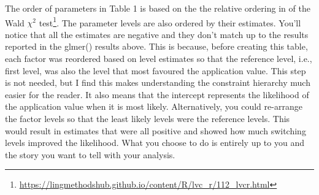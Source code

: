 \documentclass[
  10pt,
  letterpaper]{article}
\renewcommand\texttt[1]{{\ttfamily\color{BrickRed}#1}}
\DeclareRobustCommand{\href}[2]{#2\footnote{\url{#1}}}
\begin{document}
The order of parameters in Table 1 is based on the the relative ordering
in of the
\href{https://lingmethodshub.github.io/content/R/lvc_r/112_lvcr.html}{Wald
\(\chi^2\) test}. The parameter levels are also ordered by their
estimates. You'll notice that all the estimates are negative and they
don't match up to the results reported in the \texttt{glmer()} results
above. This is because, before creating this table, each factor was
reordered based on level estimates so that the reference level, i.e.,
first level, was also the level that most favoured the application
value. This step is not needed, but I find this makes understanding the
constraint hierarchy much easier for the reader. It also means that the
intercept represents the likelihood of the application value when it is
most likely. Alternatively, you could re-arrange the factor levels so
that the least likely levels were the reference levels. This would
result in estimates that were all positive and showed how much switching
levels improved the likelihood. What you choose to do is entirely up to
you and the story you want to tell with your analysis.
\end{document}
